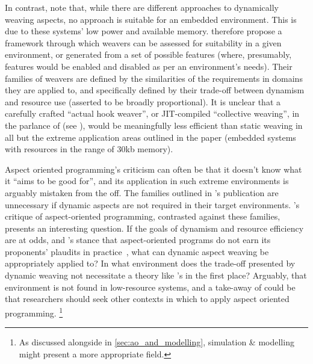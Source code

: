In contrast, \citeauthor{gilani2004family} note that, while there are different
approaches to dynamically weaving aspects, no approach is suitable for an
embedded environment. This is due to these systems' low power and available
memory. \citeauthor{gilani2004family} therefore propose a framework through
which weavers can be assessed for suitability in a given environment, or
generated from a set of possible features (where, presumably, features would be
enabled and disabled as per an environment's needs). Their families of weavers
are defined by the similarities of the requirements in domains they are applied
to, and specifically defined by their trade-off between dynamism and resource use
(asserted to be broadly proportional). It is unclear that a carefully crafted
``actual hook weaver'', or JIT-compiled ``collective weaving'', in the parlance
of \citeauthor{dynamicAOchitchyan} (see \citep{dynamicAOchitchyan}), would be
meaningfully less efficient than static weaving in all but the extreme
application areas outlined in the paper (embedded systems with resources in the
range of 30kb memory).

Aspect oriented programming's criticism can often be that it doesn't know what
it ``aims to be good for'', and its application in such extreme environments is
arguably mistaken from the off. The families outlined in
\citeauthor{gilani2004family}'s publication are unnecessary if dynamic aspects
are not required in their target environments.
's critique of aspect-oriented programming,
contrasted against these families, presents an interesting question. If the
goals of dynamism and resource efficiency are at odds, and
\citeauthor{steimann06paradoxical}'s stance that aspect-oriented programs do not
earn its proponents' plaudits in practice~, what can
dynamic aspect weaving be appropriately applied to? In what environment does the
trade-off presented by dynamic weaving not necessitate a theory like
\citeauthor{gilani2004family}'s in the first place? Arguably, that environment
is not found in low-resource systems, and a take-away of \cite{gilani2004family}
could be that researchers should seek other contexts in which to apply aspect
oriented programming. \footnote{As discussed alongside \cite{gulyas1999use} in
\cref{sec:ao_and_modelling}, simulation \& modelling might present a more
appropriate field.}~




